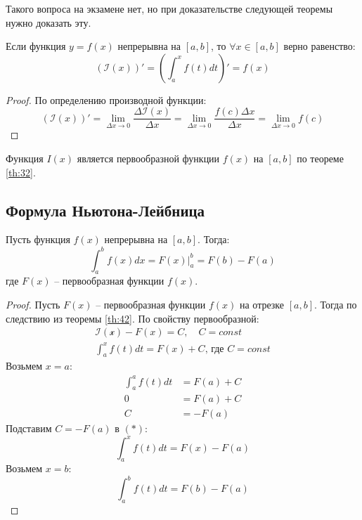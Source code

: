 \begin{note}
  Такого вопроса на экзамене нет, но при доказательстве следующей теоремы нужно доказать эту.
\end{note}

\begin{theorem}[О производной]
  \label{th:42}
  Если функция $y = f(x)$ непрерывна на $[a, b]$, то  $\forall x \in [a, b]$ верно равенство: \[
    \left( \mathcal{I}(x) \right)' = \left( \int_a^x f(t) dt \right)' = f(x)
  \] 
\end{theorem}
\begin{proof}
  По определению производной функции: \[
    \left( \mathcal{I}(x) \right)' = \lim_{\Delta x \to 0} \frac{\Delta \mathcal{I}(x)}{\Delta x} = \lim_{\Delta x \to 0} \frac{f(c) \Delta x}{\Delta x} = \lim_{\Delta x \to 0} f(c)
  \] 
\end{proof}


\begin{consequence}
  Функция $I(x)$ является первообразной функции $f(x)$ на  $[a, b]$ по теореме \ref{th:32}.
\end{consequence}

\subsection{Формула Ньютона-Лейбница}

\begin{theorem}
  Пусть функция $f(x)$ непрерывна на $[a, b]$. Тогда:  \[
    \int_a^b f(x) dx = F(x) \bigg|_a^b = F(b) - F(a)
  \] 
  где $F(x)$ -- первообразная функции $f(x)$.
\end{theorem}
\begin{proof}
  Пусть $F(x)$ -- первообразная функции $f(x)$ на отрезке $[a, b]$. Тогда по следствию из теоремы \ref{th:42}.
  По свойству первообразной:
  \begin{gather*}
    \mathcal{I(x)} - F(x) = C, \quad C = const \\
    \int_a^x f(t) dt = F(x) + C \text{, где } C = const \tag{*} 
  \end{gather*}
  Возьмем $x = a$:
  \begin{align*}
    \int_a^a f(t)dt &= F(a) + C \\
    0 &= F(a) + C \\
    C &= -F(a)
  \end{align*}
  Подставим $C = -F(a)$ в  $(*)$:  \[
    \int_a^x f(t) dt = F(x) - F(a)
  \] 
  Возьмем $x = b$: \[
    \boxed{\int_a^b f(t) dt = F(b) - F(a)}
  \] 
\end{proof}

